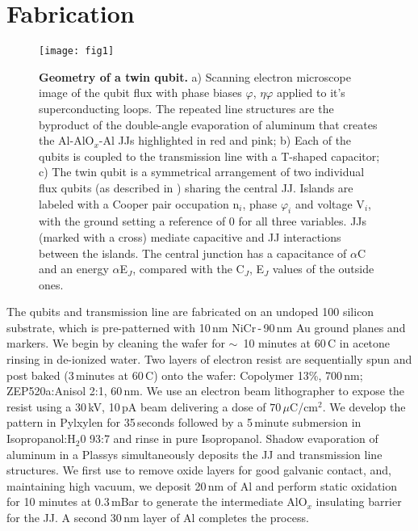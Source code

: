 \section{Fabrication}


\begin{figure}[h]
  \texttt{[image: fig1]}
  \caption{\small \textbf{Geometry of a twin qubit.}  a) Scanning electron microscope image of
    the qubit flux with phase biases $ \varphi $,  $ \eta\varphi $ applied to it's superconducting loops. The
    repeated line  structures are the  byproduct of  the double-angle evaporation  of aluminum
    that creates the Al-AlO$_x$-Al  JJs highlighted in red and pink; b) Each  of the qubits is
    coupled  to the  transmission line  with a  T-shaped  capacitor; c)  The twin  qubit is  a
    symmetrical arrangement of two individual flux qubits (as described in \cite{orlando1999})
    sharing the central  JJ.  Islands are labeled  with a Cooper pair  occupation n$_i$, phase
    $\varphi_i$ and voltage V$_i$, with the ground setting a reference of 0 for all three variables.
    JJs (marked with a cross) mediate capacitive and JJ interactions between the islands.  The
    central junction has  a capacitance of $\alpha$C  and an energy $ \alpha$E$_{J}$,  compared with the
    C$_J$, E$_J$ values of the outside ones.}
  \label{fig:setup}
\end{figure}

\noindent The qubits and transmission line are fabricated on an undoped 100 silicon substrate,
which is pre-patterned with  10\,nm NiCr\,-\,90\,nm Au ground planes and  markers. We begin by
cleaning the wafer  for $\sim$~10 minutes at  60\,C in acetone rinsing in  de-ionized water.  Two
layers of electron resist are sequentially spun  and post baked (3\,minutes at 60\,C) onto the
wafer:  {Copolymer 13\%},  700\,nm;  ZEP520a:Anisol  2:1, 60\,nm.   We  use  an electron  beam
lithographer  to  expose  the  resist  using  a 30\,kV,  10\,pA  beam  delivering  a  dose  of
$ 70\,\mu $C/cm$^2$.  We develop the pattern in Pylxylen for 35\,seconds followed by a 5\,minute
submersion in  Isopropanol:H$_2$0 93:7 and rinse  in pure Isopropanol.  Shadow  evaporation of
aluminum  in a  Plassys \cite{wu2013}  simultaneously deposits  the JJ  and transmission  line
structures.   We first  use    to  remove oxide  layers  for good  galvanic
contact, and, maintaining  high vacuum, we deposit  20\,nm of Al and  perform static oxidation
for 10 minutes  at 0.3\,mBar to generate  the intermediate AlO$_x$ insulating  barrier for the
JJ.  A second 30\,nm layer of Al completes the process.

